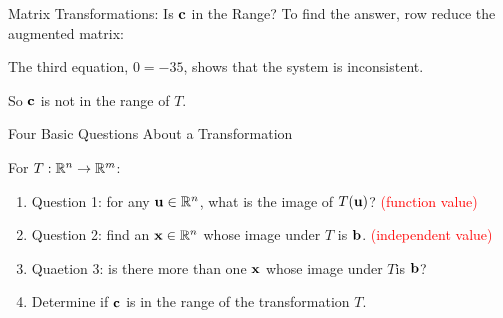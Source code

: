 \begin{frame}{Matrix Transformations: Is $\mathbf{c}$ in the Range?}
To find the answer, row reduce the augmented matrix:
  \small

\begin{center}

\end{center}
The third equation, $0=-35$, shows that the system is inconsistent.


So $\mathbf{c}$ is not in the range of $T$.
\end{frame}

\begin{frame}{Four Basic Questions About a Transformation}

For $T:\mathbb{R}^n\to\mathbb{R}^m$:
\begin{enumerate}
\item Question 1: for any $\mathbf{u}\in\mathbb{R}^n$, what is the image of $T(\mathbf{u})$? \textcolor{red}{(function value)}
\item Question 2: find an $\mathbf{x}\in\mathbb{R}^n$ whose image under $T$ is $\mathbf{b}$. \textcolor{red}{(independent value)}
\item Quaetion 3: is there more than one $\mathbf{x}$ whose image under $T$is $\mathbf{b}$?
\item Determine if $\mathbf{c}$ is in the range of the transformation $T$.
\end{enumerate}
\end{frame}

